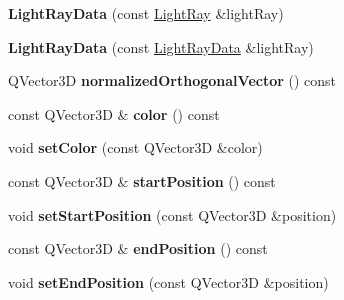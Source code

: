 \begin{DoxyCompactItemize}
\item 
\hypertarget{class_light_ray_data_a50350aa163fd7c1a54f97cefafd2d2f7}{}{\bfseries Light\+Ray\+Data} (const \hyperlink{class_light_ray}{Light\+Ray} \&light\+Ray)\label{class_light_ray_data_a50350aa163fd7c1a54f97cefafd2d2f7}

\item 
\hypertarget{class_light_ray_data_a9344f139cafb257f61f4d800fbecd905}{}{\bfseries Light\+Ray\+Data} (const \hyperlink{class_light_ray_data}{Light\+Ray\+Data} \&light\+Ray)\label{class_light_ray_data_a9344f139cafb257f61f4d800fbecd905}

\item 
\hypertarget{class_light_ray_data_acada2319ae380a11a405817cd9cd3d65}{}Q\+Vector3\+D {\bfseries normalized\+Orthogonal\+Vector} () const \label{class_light_ray_data_acada2319ae380a11a405817cd9cd3d65}

\item 
\hypertarget{class_light_ray_data_a64a5b7f8d4c3af9cc3e8c1a6c6ea8c57}{}const Q\+Vector3\+D \& {\bfseries color} () const \label{class_light_ray_data_a64a5b7f8d4c3af9cc3e8c1a6c6ea8c57}

\item 
\hypertarget{class_light_ray_data_ad8fead207765a43bb1167e2ce95e85a4}{}void {\bfseries set\+Color} (const Q\+Vector3\+D \&color)\label{class_light_ray_data_ad8fead207765a43bb1167e2ce95e85a4}

\item 
\hypertarget{class_light_ray_data_af040092e873e42d0d31f803452fc648e}{}const Q\+Vector3\+D \& {\bfseries start\+Position} () const \label{class_light_ray_data_af040092e873e42d0d31f803452fc648e}

\item 
\hypertarget{class_light_ray_data_a464a868047052152f375cb45ac476eb2}{}void {\bfseries set\+Start\+Position} (const Q\+Vector3\+D \&position)\label{class_light_ray_data_a464a868047052152f375cb45ac476eb2}

\item 
\hypertarget{class_light_ray_data_ab47d397dcffe8a2c8da0cf4d8bbbd2bc}{}const Q\+Vector3\+D \& {\bfseries end\+Position} () const \label{class_light_ray_data_ab47d397dcffe8a2c8da0cf4d8bbbd2bc}

\item 
\hypertarget{class_light_ray_data_ad7ec7b96408f0fb7f603687c54804d3b}{}void {\bfseries set\+End\+Position} (const Q\+Vector3\+D \&position)\label{class_light_ray_data_ad7ec7b96408f0fb7f603687c54804d3b}


\end{DoxyCompactItemize}
